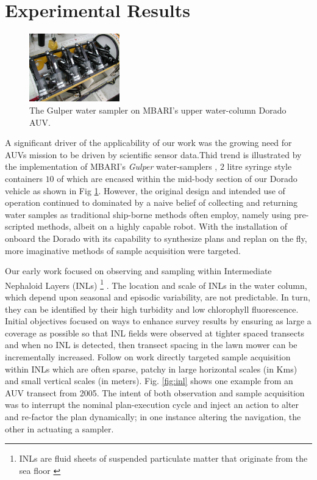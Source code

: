 \section{Experimental Results}
\label{sec:results}



\begin{figure}[htpb]
\centering
\includegraphics[width=0.35\textwidth]{figs/gulper.jpg}
\caption{\small{The Gulper water sampler \cite{Bird07} on MBARI's
    upper water-column Dorado AUV.}}
\label{fig:gulper}
\end{figure}

A significant driver of the applicability of our work was the
growing need for AUVs mission to be driven by scientific sensor 
data.Thid trend is illustrated by the 
implementation of MBARI's \emph{Gulper} water-samplers \cite{Bird07},
$2$ litre syringe style containers $10$ of which are encased within
the mid-body section of our Dorado vehicle as shown in Fig
\ref{fig:gulper}. However, the original design and intended use of
operation continued to dominated by a naive belief of collecting and
returning water samples as traditional ship-borne methods often
employ, namely using pre-scripted methods, albeit on a highly capable
robot. With the installation of \rx onboard the Dorado with its
capability to synthesize plans and replan on the fly, more imaginative
methods of sample acquisition were targeted.

Our early work focused on observing and sampling within Intermediate
Nephaloid Layers (INLs) \footnote{INLs are fluid sheets of suspended
  particulate matter that originate from the sea floor
  \cite{mcphee-shaw2006}} \cite{ryan10}. The location and scale of
INLs in the water column, which depend upon seasonal and episodic
variability, are not predictable. In turn, they can be identified by
their high turbidity and low chlorophyll fluorescence. Initial
objectives focused on ways to enhance survey results by ensuring as
large a coverage as possible so that INL fields were observed at
tighter spaced transects and when no INL is detected, then transect
spacing in the lawn mower can be incrementally increased. Follow on
work directly targeted sample acquisition within INLs which are often
sparse, patchy in large horizontal scales (in Kms) and small vertical
scales (in meters). Fig. \ref{fig:inl} shows one example from an AUV
transect from 2005. The intent of both observation and sample
acquisition was to interrupt the nominal plan-execution cycle and
inject an action to alter and re-factor the plan dynamically; in one
instance altering the navigation, the other in actuating a sampler.

